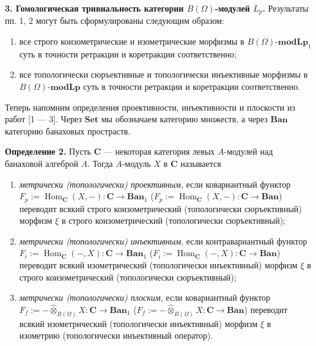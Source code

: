 \documentclass[11pt,twoside]{article}
\begin{document}
        \textbf{3. Гомологическая тривиальность категории $B(\Omega)$-модулей $L_p$.}
        Результаты пп. 1, 2 могут быть сформулированы следующим образом:
        \begin{enumerate}[label = (\roman*)]
            \item все строго коизометрические и изометрические морфизмы в
                  $B(\Omega)$-$\mathbf{modLp}_1$ суть в точности ретракции и
                  коретракции соответственно;

            \item все топологически сюръективные и топологически инъективные
                  морфизмы в $B(\Omega)$-$\mathbf{modLp}$ суть в точности
                  ретракции и коретракции соответственно.
        \end{enumerate}
        Теперь напомним определения проективности, инъективности и плоскости из
        работ [1 --- 3]. Через $\mathbf{Set}$ мы обозначаем категорию множеств,
        а через $\mathbf{Ban}$ категорию банаховых простраств.

        \textbf{Определение 2.} Пусть $\mathbf{C}$ --- некоторая категория левых
    $A$-модулей над банаховой алгеброй $A$. Тогда $A$-модуль $X$ в $\mathbf{C}$
        называется
        \begin{enumerate}[label = (\roman*)]
            \item \textit{метрически (топологически) проективным}, если
                  ковариантный функтор
                  $F_p
                      :=\operatorname{Hom}_{\mathbf{C}}(X,-):\mathbf{C}\to\mathbf{Ban}_1$
                  ($F_p
                      :=\operatorname{Hom}_{\mathbf{C}}(X,-):\mathbf{C}\to\mathbf{Ban}$)
                  переводит всякий строго коизометрический (топологически
                  сюръективный) морфизм $\xi$ в строго коизометрический
                  (топологически сюръективный);

            \item \textit{метрически (топологически) инъективным}, если
                  контравариантный функтор
                  $F_i
                      :=\operatorname{Hom}_{\mathbf{C}}(-,X):\mathbf{C}\to\mathbf{Ban}_1$
                  ($F_i
                      :=\operatorname{Hom}_{\mathbf{C}}(-,X):\mathbf{C}\to\mathbf{Ban}$)
                  переводит всякий изометрический (топологически инъективный)
                  морфизм $\xi$ в строго коизометрический (топологически
                  сюръективный);

            \item \textit{метрически (топологически) плоским}, если ковариантный
                  функтор
                  $F_f
                      :=-\widehat{\otimes}_{B(\Omega)}X:\mathbf{C}\to\mathbf{Ban}_1$
                  ($F_f
                      :=-\widehat{\otimes}_{B(\Omega)}X:\mathbf{C}\to\mathbf{Ban}$)
                  переводит всякий изометрический (топологически инъективный)
                  морфизм $\xi$ в изометрию (топологически инъективный
                  оператор).
        \end{enumerate}
\end{document}

